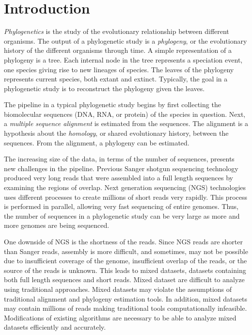 \chapter{Introduction}
%
\emph{Phylogenetics} is the study of the evolutionary relationship between different organisms.  The output of a phylogenetic study is a \emph{phylogeny}, or the evolutionary history of the different organisms through time.  A simple representation of a phylogeny is a tree.  Each internal node in the tree represents a speciation event, one species giving rise to new lineages of species.  The leaves of the phylogeny represents current species, both extant and extinct.  Typically, the goal in a phylogenetic study is to reconstruct the phylogeny given the leaves.

The pipeline in a typical phylogenetic study begins by first collecting the biomolecular sequences (DNA, RNA, or protein) of the species in question.  Next, a \emph{multiple sequence alignment} is estimated from the sequences.  The alignment is a hypothesis about the \emph{homology}, or shared evolutionary history, between the sequences.  From the alignment, a phylogeny can be estimated.  

The increasing size of the data, in terms of the number of sequences, presents new challenges in the pipeline.  Previous Sanger shotgun sequencing technology produced very long reads that were assembled into a full length sequences by examining the regions of overlap.  Next generation sequencing (NGS) technologies uses different processes to create millions of short reads very rapidly.  This process is performed in parallel, allowing very fast sequencing of entire genomes.  Thus, the number of sequences in a phylogenetic study can be very large as more and more genomes are being sequenced.

One downside of NGS is the shortness of the reads.  Since NGS reads are shorter than Sanger reads, assembly is more difficult, and sometimes, may not be possible due to insufficient coverage of the genome, insufficient overlap of the reads, or the source of the reads is unknown.  This leads to mixed datasets, datasets containing both full length sequences and short reads.  Mixed dataset are difficult to analyze using traditional approaches.  Mixed datasets may violate the assumptions of traditional alignment and phylogeny estimation tools.  In addition, mixed datasets may contain millions of reads making traditional tools computationally infeasible. Modifications of existing algorithms are necessary to be able to analyze mixed datasets efficiently and accurately.


